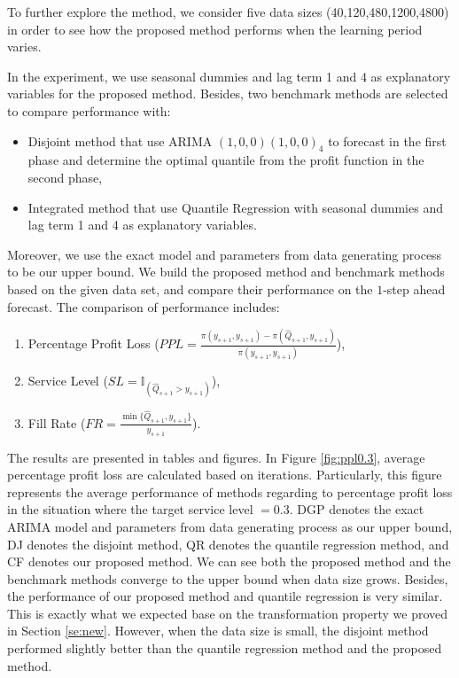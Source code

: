 \documentclass{article}
\begin{document}
To further explore the method, we consider five data sizes (40,120,480,1200,4800) in order to see how the proposed method performs when the learning period varies.

In the experiment, we use seasonal dummies and lag term 1 and 4 as explanatory variables for the proposed method. Besides, two benchmark methods are selected to compare performance with:
\begin{itemize}
    \item Disjoint method that use ARIMA $(1,0,0)(1,0,0)_4$ to forecast in the first phase and determine the optimal quantile from the profit function in the second phase,
    \item Integrated method that use Quantile Regression with seasonal dummies and lag term 1 and 4 as explanatory variables.
\end{itemize}
Moreover, we use the exact model and parameters from data generating process to be our upper bound. We build the proposed method and benchmark methods based on the given data set, and compare their performance on the $1$-step ahead forecast. The comparison of performance includes:
\begin{enumerate}
    \item Percentage Profit Loss ($PPL=\frac{\pi(y_{s+1},y_{s+1})-\pi(\hat{Q}_{s+1},y_{s+1})}{\pi(y_{s+1},y_{s+1})}$),
    \item Service Level ($SL=\mathbb {I}_{(\hat{Q}_{s+1}>y_{s+1})}$),
    \item Fill Rate ($FR=\frac{\min\{\hat{Q}_{s+1},y_{s+1}\}}{y_{s+1}}$).
\end{enumerate}

The results are presented in tables and figures. In Figure \ref{fig:ppl0.3}, average percentage profit loss are calculated based on iterations. Particularly, this figure represents the average performance of methods regarding to percentage profit loss in the situation where the target service level $=0.3$. DGP denotes the exact ARIMA model and parameters from data generating process as our upper bound, DJ denotes the disjoint method, QR denotes the quantile regression method, and CF denotes our proposed method. We can see both the proposed method and the benchmark methods converge to the upper bound when data size grows. Besides, the performance of our proposed method and quantile regression is very similar. This is exactly what we expected base on the transformation property we proved in Section \ref{se:new}. However, when the data size is small, the disjoint method performed slightly better than the quantile regression method and the proposed method. 
\end{document}
